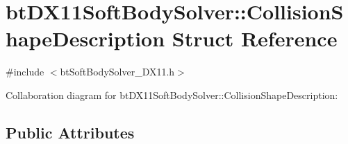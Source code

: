 \hypertarget{structbt_d_x11_soft_body_solver_1_1_collision_shape_description}{\section{bt\+D\+X11\+Soft\+Body\+Solver\+:\+:Collision\+Shape\+Description Struct Reference}
\label{structbt_d_x11_soft_body_solver_1_1_collision_shape_description}
}


{\ttfamily \#include $<$bt\+Soft\+Body\+Solver\+\_\+\+D\+X11.\+h$>$}



Collaboration diagram for bt\+D\+X11\+Soft\+Body\+Solver\+:\+:Collision\+Shape\+Description\+:
\subsection*{Public Attributes}
